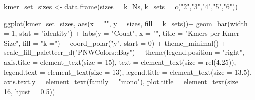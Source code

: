 \documentclass[
  letterpaper,
]{article}
\newenvironment{Shaded}{\begin{snugshade}}{\end{snugshade}}
\newcommand{\AttributeTok}[1]{\textcolor[rgb]{0.40,0.45,0.13}{#1}}
\newcommand{\DecValTok}[1]{\textcolor[rgb]{0.68,0.00,0.00}{#1}}
\newcommand{\FloatTok}[1]{\textcolor[rgb]{0.68,0.00,0.00}{#1}}
\newcommand{\FunctionTok}[1]{\textcolor[rgb]{0.28,0.35,0.67}{#1}}
\newcommand{\NormalTok}[1]{\textcolor[rgb]{0.00,0.23,0.31}{#1}}
\newcommand{\OtherTok}[1]{\textcolor[rgb]{0.00,0.23,0.31}{#1}}
\newcommand{\SpecialCharTok}[1]{\textcolor[rgb]{0.37,0.37,0.37}{#1}}
\newcommand{\StringTok}[1]{\textcolor[rgb]{0.13,0.47,0.30}{#1}}
\begin{document}
\begin{figure}%
\end{figure}%

\begin{Shaded}
\begin{Highlighting}[]
\NormalTok{kmer\_set\_sizes }\OtherTok{\textless{}{-}} \FunctionTok{data.frame}\NormalTok{(}\AttributeTok{sizes =}\NormalTok{ k\_Ns,}
  \AttributeTok{k\_sets =} \FunctionTok{c}\NormalTok{(}\StringTok{"2"}\NormalTok{,}\StringTok{"3"}\NormalTok{,}\StringTok{"4"}\NormalTok{,}\StringTok{"5"}\NormalTok{,}\StringTok{"6"}\NormalTok{))}

\FunctionTok{ggplot}\NormalTok{(kmer\_set\_sizes, }\FunctionTok{aes}\NormalTok{(}\AttributeTok{x =} \StringTok{""}\NormalTok{, }\AttributeTok{y =}\NormalTok{ sizes,}
                           \AttributeTok{fill =}\NormalTok{ k\_sets))}\SpecialCharTok{+} 
  \FunctionTok{geom\_bar}\NormalTok{(}\AttributeTok{width =} \DecValTok{1}\NormalTok{, }\AttributeTok{stat =} \StringTok{"identity"}\NormalTok{) }\SpecialCharTok{+} 
  \FunctionTok{labs}\NormalTok{(}\AttributeTok{y =} \StringTok{"Count"}\NormalTok{, }\AttributeTok{x =} \StringTok{""}\NormalTok{, }
       \AttributeTok{title =} \StringTok{"Kmers per Kmer Size"}\NormalTok{, }
       \AttributeTok{fill =} \StringTok{"k ="}\NormalTok{) }\SpecialCharTok{+}
  \FunctionTok{coord\_polar}\NormalTok{(}\StringTok{"y"}\NormalTok{, }\AttributeTok{start =} \DecValTok{0}\NormalTok{) }\SpecialCharTok{+}
  \FunctionTok{theme\_minimal}\NormalTok{() }\SpecialCharTok{+}
  \FunctionTok{scale\_fill\_paletteer\_d}\NormalTok{(}\StringTok{"PNWColors::Bay"}\NormalTok{) }\SpecialCharTok{+}
  \FunctionTok{theme}\NormalTok{(}\AttributeTok{legend.position =} \StringTok{"right"}\NormalTok{, }
        \AttributeTok{axis.title =} \FunctionTok{element\_text}\NormalTok{(}\AttributeTok{size =} \DecValTok{15}\NormalTok{),}
        \AttributeTok{text =} \FunctionTok{element\_text}\NormalTok{(}\AttributeTok{size =} \FunctionTok{rel}\NormalTok{(}\FloatTok{4.25}\NormalTok{)),}
        \AttributeTok{legend.text =} \FunctionTok{element\_text}\NormalTok{(}\AttributeTok{size =} \DecValTok{13}\NormalTok{),}
        \AttributeTok{legend.title =} \FunctionTok{element\_text}\NormalTok{(}\AttributeTok{size =} \FloatTok{13.5}\NormalTok{),}
        \AttributeTok{axis.text.y =} \FunctionTok{element\_text}\NormalTok{(}\AttributeTok{family =} \StringTok{"mono"}\NormalTok{),}
        \AttributeTok{plot.title =} \FunctionTok{element\_text}\NormalTok{(}\AttributeTok{size =} \DecValTok{16}\NormalTok{, }\AttributeTok{hjust =} \FloatTok{0.5}\NormalTok{))}
\end{Highlighting}
\end{Shaded}
\end{document}
